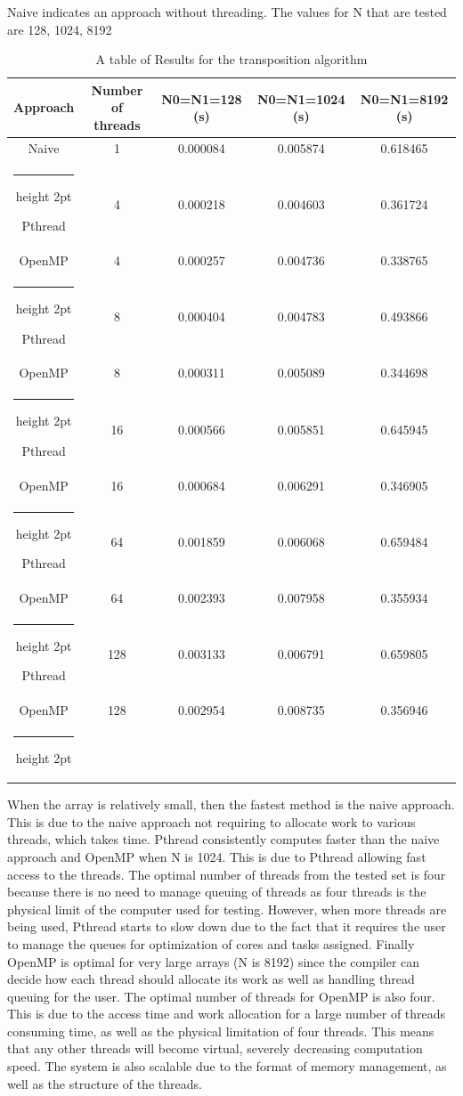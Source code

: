 \documentclass[conference]{IEEEtran}
\makeatletter
\newcommand{\thickhline}{%
    \noalign {\ifnum 0=`}\fi \hrule height 2pt
    \futurelet \reserved@a \@xhline
}
\makeatother
\begin{document}
\noindent Naive indicates an approach without threading. The values for N that are tested are 128, 1024, 8192\\

\begin{table}[H]
\centering
\caption{A table of Results for the transposition algorithm} 
\begin{tabular}{|c|c|c|c|c|}
  \hline
 Approach & Number of threads & N0=N1=128 (s) & N0=N1=1024 (s) & N0=N1=8192 (s) \\
\hline
Naive & 1 & 0.000084 & 0.005874 & 0.618465 \\
\thickhline
Pthread & 4 & 0.000218 & 0.004603 & 0.361724\\
\hline
OpenMP & 4 & 0.000257 & 0.004736 & 0.338765 \\
\thickhline
Pthread & 8 & 0.000404 & 0.004783 & 0.493866\\
\hline
OpenMP & 8 & 0.000311 & 0.005089 & 0.344698 \\
\thickhline
Pthread & 16 & 0.000566 & 0.005851 & 0.645945\\
\hline
OpenMP & 16 & 0.000684 & 0.006291 & 0.346905\\
\thickhline
Pthread & 64 & 0.001859 & 0.006068 & 0.659484\\
\hline
OpenMP & 64 & 0.002393 & 0.007958 & 0.355934\\
\thickhline
Pthread & 128 & 0.003133 & 0.006791 & 0.659805\\
\hline
OpenMP & 128 & 0.002954 & 0.008735 & 0.356946\\
\thickhline

\end{tabular}

\end{table} 

When the array is relatively small, then the fastest method is the naive approach. This is due to the naive approach not requiring to allocate work to various threads, which takes time. Pthread consistently computes faster than the naive approach and OpenMP when N is 1024. This is due to Pthread allowing fast access to the threads. The optimal number of threads from the tested set is four because there is no need to manage queuing of threads as four threads is the physical limit of the computer used for testing. However, when more threads are being used, Pthread starts to slow down due to the fact that it requires the user to manage the queues for optimization of cores and tasks assigned. Finally OpenMP is optimal for very large arrays (N is 8192) since the compiler can decide how each thread should allocate its work as well as handling thread queuing for the user. The optimal number of threads for OpenMP is also four. This is due to the access time and work allocation for a large number of threads consuming time, as well as the physical limitation of four threads. This means that any other threads will become virtual, severely decreasing computation speed.  The system is also scalable due to the format of memory management, as well as the structure of the threads.\\
\end{document}
